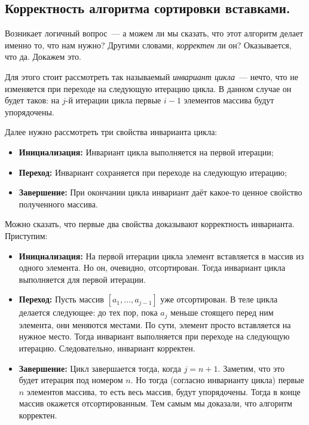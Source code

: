 \documentclass[a4paper,12pt]{article}
\begin{document}
\subsection{Корректность алгоритма сортировки вставками.}
Возникает логичный вопрос~--- а можем ли мы сказать, что этот алгоритм делает именно то, что нам нужно? Другими словами, \emph{корректен} ли он? Оказывается, что да. Докажем это.

Для этого стоит рассмотреть так называемый \emph{инвариант цикла}~--- нечто, что не изменяется при переходе на следующую итерацию цикла. В данном случае он будет таков: на \(j\)-й итерации цикла первые \(i - 1\) элементов массива будут упорядочены.

Далее нужно рассмотреть три свойства инварианта цикла:
\begin{itemize}
	\item \textbf{Инициализация:} Инвариант цикла выполняется на первой итерации;
	
	\item \textbf{Переход:} Инвариант сохраняется при переходе на следующую итерацию;
	
	\item \textbf{Завершение:} При окончании цикла инвариант даёт какое-то ценное свойство полученного массива.
	\end{itemize}
	Можно сказать, что первые два свойства доказывают корректность инварианта. Приступим:
	\begin{itemize}
		\item \textbf{Инициализация:} На первой итерации цикла элемент вставляется в массив из одного элемента. Но он, очевидно, отсортирован. Тогда инвариант цикла выполняется для первой итерации.
		
		\item \textbf{Переход:} Пусть массив \([a_1, \ldots, a_{j - 1}]\) уже отсортирован. В теле цикла делается следующее: до тех пор, пока \(a_{j}\) меньше стоящего перед ним элемента, они меняются местами. По сути, элемент просто вставляется на нужное место. Тогда инвариант выполняется при переходе на следующую итерацию. Следовательно, инвариант корректен.
		
		\item \textbf{Завершение:} Цикл завершается тогда, когда \(j = n + 1\). Заметим, что это будет итерация под номером \(n\). Но тогда (согласно инварианту цикла) первые \(n\) элементов массива, то есть весь массив, будут упорядочены. Тогда в конце массив окажется отсортированным. Тем самым мы доказали, что алгоритм корректен.
		\end{itemize}
\end{document}
